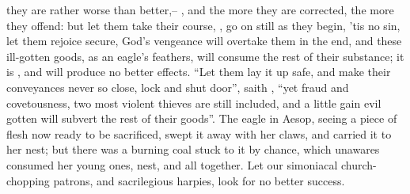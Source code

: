 they are rather worse than better,-- ,
and the more they are corrected, the more they offend: but let them take their
course, , go on still as they begin,
'tis no sin, let them rejoice secure, God's vengeance will overtake them in the
end, and these ill-gotten goods, as an eagle's feathers,
will consume the rest of their substance; it is
, and will produce no better effects.
\enquote{Let them lay it up safe, and make their conveyances never
so close, lock and shut door}, saith \Chrysostom{}, \enquote{yet fraud and covetousness,
two most violent thieves are still included, and a little gain evil gotten will
subvert the rest of their goods}. The eagle in Aesop, seeing a piece of flesh
now ready to be sacrificed, swept it away with her claws, and carried it to her
nest; but there was a burning coal stuck to it by chance, which unawares
consumed her young ones, nest, and all together. Let our simoniacal
church-chopping patrons, and sacrilegious harpies, look for no better success.

